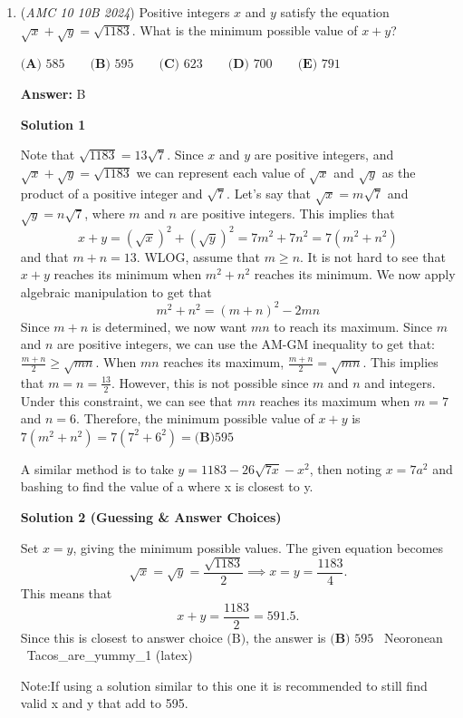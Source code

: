 \begin{enumerate}
 


	\item (\textit{AMC 10 10B 2024}) Positive integers $x$ and $y$ satisfy the equation $\sqrt{x} + \sqrt{y} = \sqrt{1183}$. What is the minimum possible value of $x+y$?


 $\textbf{(A) } 585 \qquad\textbf{(B) } 595 \qquad\textbf{(C) } 623 \qquad\textbf{(D) } 700 \qquad\textbf{(E) } 791$

 \textbf{Answer: }B



\textbf{Solution 1}

Note that $\sqrt{1183}=13\sqrt7$. Since $x$ and $y$ are positive integers, and $\sqrt{x}+\sqrt{y}=\sqrt{1183}$ we can represent each value of $\sqrt{x}$ and $\sqrt{y}$ as the product of a positive integer and $\sqrt7$. Let's say that $\sqrt{x}=m\sqrt7$ and $\sqrt{y}=n\sqrt7$, where $m$ and $n$ are positive integers. This implies that 
 \[x+y=(\sqrt{x})^2+(\sqrt{y})^2=7m^2+7n^2=7(m^2+n^2)\] and that $m+n=13$. WLOG, assume that ${m}\geq{n}$. It is not hard to see that $x+y$ reaches its minimum when $m^2+n^2$ reaches its minimum. We now apply algebraic manipulation to get that 
 \[m^2+n^2=(m+n)^2-2mn\] Since $m+n$ is determined, we now want $mn$ to reach its maximum. Since $m$ and $n$ are positive integers, we can use the AM-GM inequality to get that: $\frac{m+n}{2}\geq{\sqrt{mn}}$. When $mn$ reaches its maximum, $\frac{m+n}{2}={\sqrt{mn}}$. This implies that $m=n=\frac{13}{2}$. However, this is not possible since $m$ and $n$ and integers. Under this constraint, we can see that $mn$ reaches its maximum when $m=7$ and $n=6$. Therefore, the minimum possible value of $x+y$ is $7(m^2+n^2)=7(7^2+6^2)=\boxed{\textbf{(B)}595}$

 A similar method is to take $y=1183-26\sqrt{7x}-x^2$, then noting $x=7a^2$ and bashing to find the value of a where x is closest to y.

 



\textbf{Solution 2 (Guessing & Answer Choices)}

Set $x=y$, giving the minimum possible values. The given equation becomes 
 \[\sqrt{x}=\sqrt{y}=\dfrac{\sqrt{1183}}{2}\implies x=y=\dfrac{1183}{4}.\]This means that 
 \[x+y=\dfrac{1183}{2}=591.5.\]Since this is closest to answer choice $\text{(B)}$, the answer is $\boxed{\textbf{(B) }595}$ ~Neoronean ~Tacos\_are\_yummy\_1 (latex)

 Note:If using a solution similar to this one it is recommended to still find valid x and y that add to 595.


\end{enumerate}

